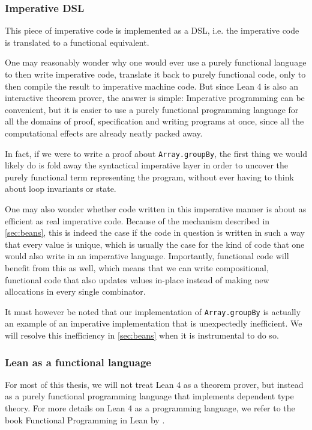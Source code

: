 \subsubsection{Imperative DSL}
This piece of imperative code is implemented as a DSL, i.e. the imperative code is translated to a functional equivalent.

One may reasonably wonder why one would ever use a purely functional language to then write imperative code, translate it back to purely functional code, only to then compile the result to imperative machine code. But since Lean 4 is also an interactive theorem prover, the answer is simple: Imperative programming can be convenient, but it is easier to use a purely functional programming language for all the domains of proof, specification and writing programs at once, since all the computational effects are already neatly packed away. 

In fact, if we were to write a proof about \lstinline|Array.groupBy|, the first thing we would likely do is fold away the syntactical imperative layer in order to uncover the purely functional term representing the program, without ever having to think about loop invariants or state.

One may also wonder whether code written in this imperative manner is about as efficient as real imperative code. Because of the mechanism described in \cref{sec:beans}, this is indeed the case if the code in question is written in such a way that every value is unique, which is usually the case for the kind of code that one would also write in an imperative language. Importantly, functional code will benefit from this as well, which means that we can write compositional, functional code that also updates values in-place instead of making new allocations in every single combinator. 

It must however be noted that our implementation of \lstinline|Array.groupBy| is actually an example of an imperative implementation that is unexpectedly inefficient. We will resolve this inefficiency in \cref{sec:beans} when it is instrumental to do so.

\subsubsection{Lean as a functional language}

For most of this thesis, we will not treat Lean 4 as a theorem prover, but instead as a purely functional programming language that implements dependent type theory. For more details on Lean 4 as a programming language, we refer to the book Functional Programming in Lean by \cite{christiansen_functional_2023}.

